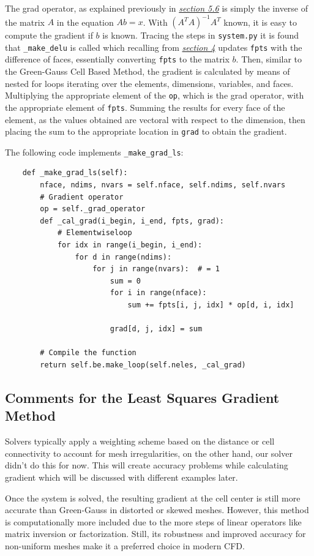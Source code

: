 \documentclass[a4paper, 12pt]{article}
\begin{document}
\par
The grad operator, as explained previously in \hyperref[matlsq]{\textit{section 5.6}} is simply the inverse of the matrix $A$ in the equation $Ab=x$. With $(A^T\!A)^{-1}A^T$ known, it is easy to compute the gradient if $b$ is known. Tracing the steps in \verb|system.py| it is found that \verb|_make_delu| is called which recalling from \hyperref[avgu]{\textit{section 4}} updates \verb|fpts| with the difference of faces, essentially converting \verb|fpts| to the matrix $b$. Then, similar to the Green-Gauss Cell Based Method, the gradient is calculated by means of nested for loops iterating over the elements, dimensions, variables, and faces. Multiplying the appropriate element of the \verb|op|, which is the grad operator, with the appropriate element of \verb|fpts|. Summing the results for every face of the element, as the values obtained are vectoral with respect to the dimension, then placing the sum to the appropriate location in \verb|grad| to obtain the gradient.\newpage\par
The following code implements \verb|_make_grad_ls|:
\begin{verbatim}
    def _make_grad_ls(self):
        nface, ndims, nvars = self.nface, self.ndims, self.nvars
        # Gradient operator 
        op = self._grad_operator
        def _cal_grad(i_begin, i_end, fpts, grad):
            # Elementwiseloop
            for idx in range(i_begin, i_end):
                for d in range(ndims):
                    for j in range(nvars):  # = 1
                        sum = 0
                        for i in range(nface):
                            sum += fpts[i, j, idx] * op[d, i, idx]

                        grad[d, j, idx] = sum

        # Compile the function
        return self.be.make_loop(self.neles, _cal_grad)    
\end{verbatim}
\subsection{Comments for the Least Squares Gradient Method}
\par
Solvers typically apply a weighting scheme based on the distance or cell connectivity to account for mesh irregularities, on the other hand, our solver didn’t do this for now. This will create accuracy problems while calculating gradient which will be discussed with different examples later. \\\par Once the system is solved, the resulting gradient at the cell center is still more accurate than Green-Gauss in distorted or skewed meshes. However, this method is computationally more included due to the more steps of linear operators like matrix inversion or factorization. Still, its robustness and improved accuracy for non-uniform meshes make it a preferred choice in modern CFD.
\end{document}

